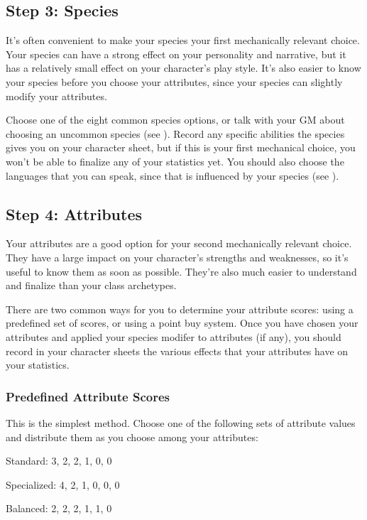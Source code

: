     \subsection{Step 3: Species}
        It's often convenient to make your species your first mechanically relevant choice.
        Your species can have a strong effect on your personality and narrative, but it has a relatively small effect on your character's play style.
        It's also easier to know your species before you choose your attributes, since your species can slightly modify your attributes.

        Choose one of the eight common species options, or talk with your GM about choosing an uncommon species (see ).
        Record any specific abilities the species gives you on your character sheet, but if this is your first mechanical choice, you won't be able to finalize any of your statistics yet.
        You should also choose the languages that you can speak, since that is influenced by your species (see ).

    \subsection{Step 4: Attributes}\label{Step 4: Attributes}
        Your attributes are a good option for your second mechanically relevant choice.
        They have a large impact on your character's strengths and weaknesses, so it's useful to know them as soon as possible.
        They're also much easier to understand and finalize than your class archetypes.

        There are two common ways for you to determine your attribute scores: using a predefined set of scores, or using a point buy system.
        Once you have chosen your attributes and applied your species modifer to attributes (if any), you should record in your character sheets the various effects that your attributes have on your statistics.

        \subsubsection{Predefined Attribute Scores}
            This is the simplest method.
            Choose one of the following sets of attribute values and distribute them as you choose among your attributes:
            \begin{raggeditemize}
                \item Standard: 3, 2, 2, 1, 0, 0
                \item Specialized: 4, 2, 1, 0, 0, 0
                \item Balanced: 2, 2, 2, 1, 1, 0
            \end{raggeditemize}

